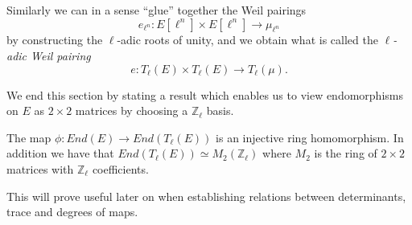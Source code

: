 Similarly we can in a sense ``glue'' together the Weil pairings
$$ e_{\ell^n} : E[\ell^n] \times E[\ell^n] \rightarrow \mu_{\ell^n} $$
by constructing the $\ell$-adic roots of unity, and we obtain what is called the
\emph{$\ell$-adic Weil pairing}
$$ e: T_\ell(E) \times T_\ell(E) \rightarrow T_\ell(\mu). $$

We end this section by stating a result which enables us to view endomorphisms on $E$ as
$2\times 2$ matrices by choosing a $\mathbb{Z}_\ell$ basis.
\begin{prop}
  The map $\phi: End(E) \rightarrow End(T_\ell(E))$ is an injective ring homomorphism. In addition
we have that $End(T_\ell(E)) \simeq M_2(\mathbb{Z}_\ell)$ where $M_2$ is the ring of $2\times 2$
matrices with $\mathbb{Z}_\ell$ coefficients.
\end{prop}
This will prove useful later on when establishing relations between determinants,
trace and degrees of maps.